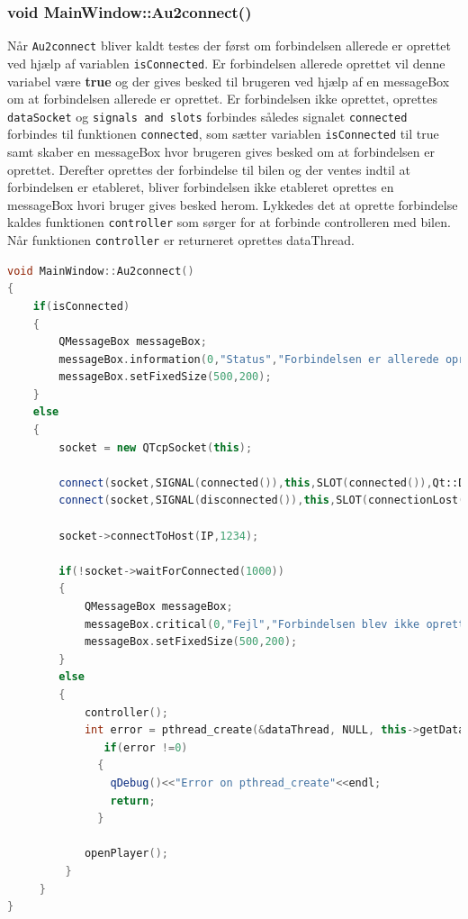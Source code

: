 \subsubsection{void MainWindow::Au2connect()}
Når \texttt{Au2connect} bliver kaldt testes der først om forbindelsen allerede er oprettet ved hjælp af variablen \texttt{isConnected}. Er forbindelsen allerede oprettet vil denne variabel være \textbf{true} og der gives besked til brugeren ved hjælp af en messageBox om at forbindelsen allerede er oprettet. Er forbindelsen ikke oprettet, oprettes \texttt{dataSocket} og \texttt{signals and slots} forbindes således signalet \texttt{connected} forbindes til funktionen \texttt{connected}, som sætter variablen \texttt{isConnected} til true samt skaber en messageBox hvor brugeren gives besked om at forbindelsen er oprettet. Derefter oprettes der forbindelse til bilen og der ventes indtil at forbindelsen er etableret, bliver forbindelsen ikke etableret oprettes en messageBox hvori bruger gives besked herom. Lykkedes det at oprette forbindelse kaldes funktionen \texttt{controller} som sørger for at forbinde controlleren med bilen. Når funktionen \texttt{controller} er returneret oprettes dataThread.

\begin{lstlisting}[caption={Au2Connect},label=lst:au2connect, language=c++]
void MainWindow::Au2connect()
{
    if(isConnected)
    {
        QMessageBox messageBox;
        messageBox.information(0,"Status","Forbindelsen er allerede oprettet!");
        messageBox.setFixedSize(500,200);
    }
    else
    {
        socket = new QTcpSocket(this);

        connect(socket,SIGNAL(connected()),this,SLOT(connected()),Qt::DirectConnection);
        connect(socket,SIGNAL(disconnected()),this,SLOT(connectionLost()),Qt::DirectConnection);

        socket->connectToHost(IP,1234);

        if(!socket->waitForConnected(1000))
        {
            QMessageBox messageBox;
            messageBox.critical(0,"Fejl","Forbindelsen blev ikke oprettet!");
            messageBox.setFixedSize(500,200);
        }
        else
        {
            controller();
            int error = pthread_create(&dataThread, NULL, this->getDataHelper ,this);
               if(error !=0)
              {
                qDebug()<<"Error on pthread_create"<<endl;
                return;
              }

            openPlayer();
         }
     }
}
\end{lstlisting}

